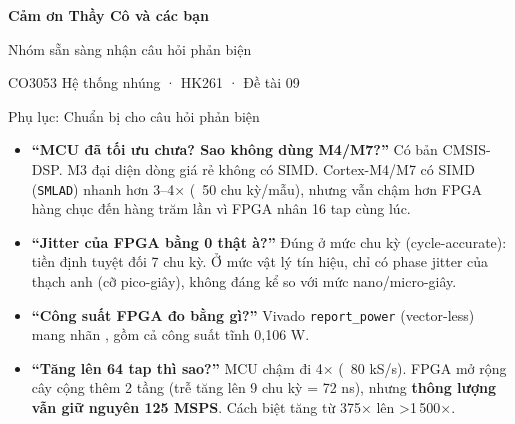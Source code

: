 \begin{frame}[plain]
\vfill\centering
{\Huge\bfseries Cảm ơn Thầy Cô và các bạn}\par\bigskip
{\Large Nhóm sẵn sàng nhận câu hỏi phản biện}\par\bigskip
{\color{cInk2}CO3053 Hệ thống nhúng · HK261 · Đề tài 09}
\vfill
\end{frame}

\appendix
\begin{frame}{Phụ lục: Chuẩn bị cho câu hỏi phản biện}
\footnotesize
\begin{itemize}\setlength{\itemsep}{2pt}
\item \textbf{``MCU đã tối ưu chưa? Sao không dùng M4/M7?''} Có bản CMSIS-DSP. M3 đại diện dòng giá rẻ không có SIMD. Cortex-M4/M7 có SIMD (\texttt{SMLAD}) nhanh hơn 3–4× (~50 chu kỳ/mẫu), nhưng vẫn chậm hơn FPGA hàng chục đến hàng trăm lần vì FPGA nhân 16 tap cùng lúc.
\item \textbf{``Jitter của FPGA bằng 0 thật à?''} Đúng ở mức chu kỳ (cycle-accurate): tiền định tuyệt đối 7 chu kỳ. Ở mức vật lý tín hiệu, chỉ có phase jitter của thạch anh (cỡ pico-giây), không đáng kể so với mức nano/micro-giây.
\item \textbf{``Công suất FPGA đo bằng gì?''} Vivado \texttt{report\_power} (vector-less) mang nhãn , gồm cả công suất tĩnh 0,106 W.
\item \textbf{``Tăng lên 64 tap thì sao?''} MCU chậm đi 4× (~80 kS/s). FPGA mở rộng cây cộng thêm 2 tầng (trễ tăng lên 9 chu kỳ = 72 ns), nhưng \textbf{thông lượng vẫn giữ nguyên 125 MSPS}. Cách biệt tăng từ 375× lên >1\,500×.
\end{itemize}
\end{frame}

